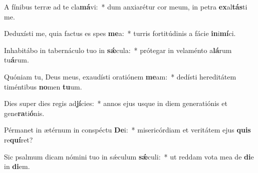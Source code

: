 \item A fínibus terræ ad te cla\textbf{má}vi:~* dum anxiarétur cor meum, in petra \textbf{ex}al\textbf{tás}ti me.
\item Deduxísti me, quia factus es spes \textbf{me}a:~* turris fortitúdinis a fácie \textbf{in}i\textbf{mí}ci.
\item Inhabitábo in tabernáculo tuo in \textbf{sǽ}cula:~* prótegar in velaménto a\textbf{lá}rum tu\textbf{á}rum.
\item Quóniam tu, Deus meus, exaudísti oratiónem \textbf{me}am:~* dedísti hereditátem timéntibus \textbf{no}men \textbf{tu}um.
\item Dies super dies regis ad\textbf{jí}cies:~* annos ejus usque in diem generatiónis et gene\textbf{ra}ti\textbf{ó}nis.
\item Pérmanet in ætérnum in conspéctu \textbf{De}i:~* misericórdiam et veritátem ejus \textbf{quis} re\textbf{quí}ret?
\item Sic psalmum dicam nómini tuo in sǽculum \textbf{sǽ}culi:~* ut reddam vota mea de \textbf{di}e in \textbf{di}em.
